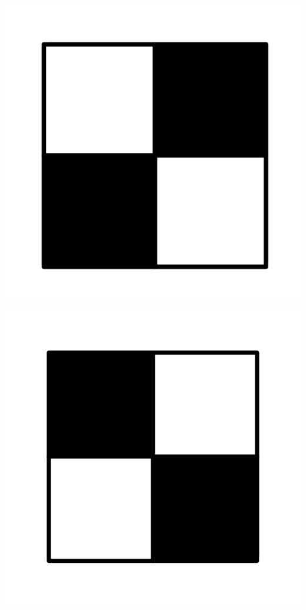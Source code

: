 \documentclass{book}
\theoremstyle{definition}
\begin{document}
\begin{center}
\includegraphics[scale=1]{eckmanhilton1.png}
\end{center}

\begin{center}
\includegraphics[scale=1]{eckmanhilton2.png}
\end{center}
\end{document}
